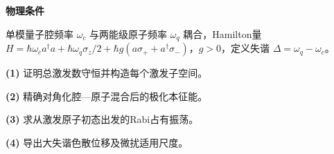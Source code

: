 \textbf{物理条件}\par 单模量子腔频率 \(\omega_c\) 与两能级原子频率 \(\omega_q\) 耦合，Hamilton量 \(H=\hbar\omega_c a^\dagger a+\hbar\omega_q\sigma_z/2+\hbar g(a\sigma_++a^\dagger\sigma_-)\)，\(g>0\)，定义失谐 \(\Delta=\omega_q-\omega_c\)。
\par\noindent\textbf{(1)} 证明总激发数守恒并构造每个激发子空间。
\par\noindent\textbf{(2)} 精确对角化腔—原子混合后的极化本征能。
\par\noindent\textbf{(3)} 求从激发原子初态出发的Rabi占有振荡。
\par\noindent\textbf{(4)} 导出大失谐色散位移及微扰适用尺度。
